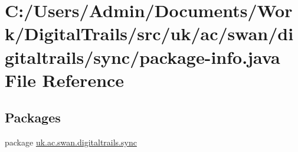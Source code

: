 \hypertarget{sync_2package-info_8java}{\section{C\+:/\+Users/\+Admin/\+Documents/\+Work/\+Digital\+Trails/src/uk/ac/swan/digitaltrails/sync/package-\/info.java File Reference}
\label{sync_2package-info_8java}
}
\subsection*{Packages}
\begin{DoxyCompactItemize}
\item 
package \hyperlink{namespaceuk_1_1ac_1_1swan_1_1digitaltrails_1_1sync}{uk.\+ac.\+swan.\+digitaltrails.\+sync}
\end{DoxyCompactItemize}
